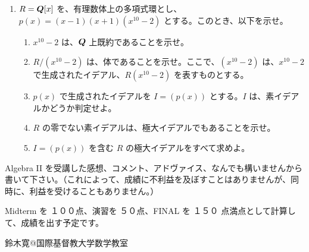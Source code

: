 \begin{enumerate}
\item $R = \mbox{\boldmath $Q$}[x]$ を、有理数体上の多項式環とし、$p(x) = (x-1)(x+1)(x^{10 }-2)$ とする。このとき、以下を示せ。
     \begin{enumerate}
     \item $x^{10 }- 2$ は、$\mbox{\boldmath $Q$}$ 上既約であることを示せ。
     \item $R/(x^{10} - 2)$ は、体であることを示せ。ここで、$(x^{10} - 2)$ は、$x^{10}-2$ で生成されたイデアル、$R(x^{10}-2)$ を表すものとする。
     \item $p(x)$ で生成されたイデアルを $I = (p(x))$ とする。$I$ は、素イデアルかどうか判定せよ。
     \item $R$ の零でない素イデアルは、極大イデアルでもあることを示せ。
     \item $I = (p(x))$ を含む $R$ の極大イデアルをすべて求めよ。
     \end{enumerate}
\end{enumerate}

 

\vspace{5ex}
\noindent Algebra II を受講した感想、コメント、アドヴァイス、なんでも構いませんから書いて下さい。（これによって、成績に不利益を及ぼすことはありませんが、同時に、利益を受けることもありません。）

\vspace{2ex}
\noindent
Midterm を １００点、演習を ５０点、FINAL を １５０ 点満点として計算して、成績を出す予定です。
         

\begin{flushright}
鈴木寛@国際基督教大学数学教室
\end{flushright}
